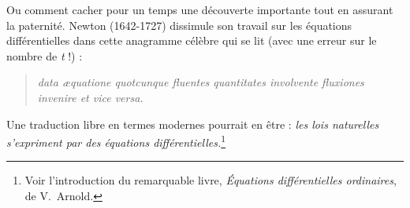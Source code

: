 \documentclass[a4paper,11pt]{article}
\begin{document}
Ou comment cacher pour un temps une découverte importante tout en
assurant la paternité. Newton (1642-1727) dissimule son travail sur les
équations différentielles dans cette anagramme célèbre qui se lit
(avec une erreur sur le nombre de \emph{t} !) :
\begin{quotation}\itshape\noindent
  data æquatione quotcunque fluentes quantitates involvente fluxiones
  invenire et vice versa.
\end{quotation}

\noindent
Une traduction libre en termes modernes pourrait en être :
{\itshape les lois naturelles s'expriment par des équations
différentielles.}\footnote{%
  Voir l'introduction du remarquable livre,
  {\slshape Équations différentielles ordinaires}, de V.~Arnold.}
\end{document}

